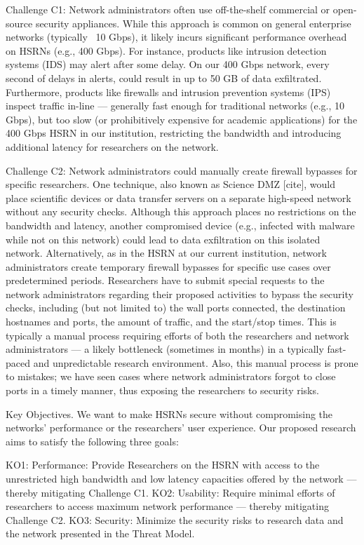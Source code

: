 Challenge C1: Network administrators often use off-the-shelf commercial or open-source security appliances. While this approach is common on general enterprise networks (typically ~10 Gbps), it likely incurs significant performance overhead on HSRNs (e.g., 400 Gbps). For instance, products like intrusion detection systems (IDS) may alert after some delay. On our 400 Gbps network, every second of delays in alerts, could result in up to 50 GB of data exfiltrated. Furthermore, products like firewalls and intrusion prevention systems (IPS) inspect traffic in-line — generally fast enough for traditional networks (e.g., 10 Gbps), but too slow (or prohibitively expensive for academic applications) for the 400 Gbps HSRN in our institution, restricting the bandwidth and introducing additional latency for researchers on the network.

Challenge C2: Network administrators could manually create firewall bypasses for specific researchers. One technique, also known as Science DMZ [cite], would place scientific devices or data transfer servers on a separate high-speed network without any security checks. Although this approach places no restrictions on the bandwidth and latency, another compromised device (e.g., infected with malware while not on this network) could lead to data exfiltration on this isolated network. Alternatively, as in the HSRN at our current institution, network administrators create temporary firewall bypasses for specific use cases over predetermined periods. Researchers have to submit special requests to the network administrators regarding their proposed activities to bypass the security checks, including (but not limited to) the wall ports connected, the destination hostnames and ports, the amount of traffic, and the start/stop times. This is typically a manual process requiring efforts of both the researchers and network administrators — a likely bottleneck (sometimes in months) in a typically fast-paced and unpredictable research environment. Also, this manual process is prone to mistakes; we have seen cases where network administrators forgot to close ports in a timely manner, thus exposing the researchers to security risks.

Key Objectives. We want to make HSRNs secure without compromising the networks' performance or the researchers' user experience. Our proposed research aims to satisfy the following three goals:

KO1: Performance: Provide Researchers on the HSRN with access to  the unrestricted high bandwidth and low latency capacities offered by the network — thereby mitigating Challenge C1.
KO2: Usability: Require minimal efforts of researchers to access maximum network performance — thereby mitigating Challenge C2.
KO3: Security: Minimize the security risks to research data and the network presented in the Threat Model.

